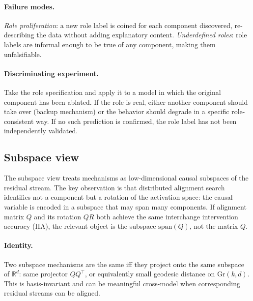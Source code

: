 \documentclass{article}
\newcommand{\Gr}{\mathrm{Gr}}
\begin{document}
\paragraph{Failure modes.}
\emph{Role proliferation}: a new role label is coined for each component
discovered, re-describing the data without adding explanatory content.
\emph{Underdefined roles}: role labels are informal enough to be true of
any component, making them unfalsifiable.

\paragraph{Discriminating experiment.}
Take the role specification and apply it to a model in which the
original component has been ablated.  If the role is real, either another
component should take over (backup mechanism) or the behavior should
degrade in a specific role-consistent way.  If no such prediction is
confirmed, the role label has not been independently validated.

\subsection{Subspace view}

The subspace view treats mechanisms as low-dimensional causal subspaces
of the residual stream.  The key observation is that distributed
alignment search \citep{geiger2021,geiger2024} identifies not a component
but a rotation of the activation space: the causal variable is encoded
in a subspace that may span many components.  If alignment matrix $Q$
and its rotation $QR$ both achieve the same interchange intervention
accuracy (IIA), the relevant object is the subspace $\mathrm{span}(Q)$,
not the matrix $Q$.

\paragraph{Identity.}
Two subspace mechanisms are the same iff they project onto the same
subspace of $\mathbb{R}^d$: same projector $QQ^\top$, or equivalently
small geodesic distance on $\Gr(k,d)$.  This is basis-invariant and
can be meaningful cross-model when corresponding residual streams can
be aligned.
\end{document}

